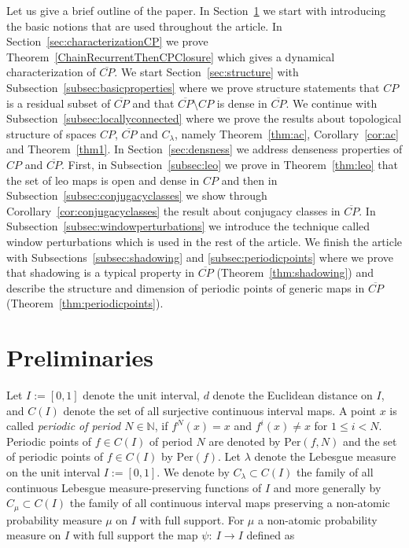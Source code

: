 \documentclass[12pt, a4paper]{amsart}
\def\per{\mathrm{Per}}
\newcommand{\?}{{\bf ???}}
\def\CP{\overline{CP}}
\begin{document}
Let us give a brief outline of the paper. In Section~\ref{subsec:preliminaries} we start with introducing the basic notions that are used throughout the article.
In Section~\ref{sec:characterizationCP} we prove Theorem~\ref{ChainRecurrentThenCPClosure} which gives a dynamical characterization of $\CP$.
We start Section~\ref{sec:structure} with Subsection~\ref{subsec:basicproperties} where we prove structure statements that $CP$ is a residual  subset of $\CP$ and that $\CP\setminus CP$ is dense in $\CP$. We continue with Subsection~\ref{subsec:locallyconnected} where we prove the results about topological structure of spaces $CP$, $\CP$ and $C_{\lambda}$, namely Theorem~\ref{thm:ac}, Corollary~\ref{cor:ac} and Theorem~\ref{thm1}. In Section~\ref{sec:densness} we address denseness properties of $CP$ and $\CP$. First, in Subsection~\ref{subsec:leo} we prove in Theorem~\ref{thm:leo} that the set of leo maps is open and dense in $CP$ and then in Subsection~\ref{subsec:conjugacyclasses} we show through Corollary~\ref{cor:conjugacyclasses} the result about conjugacy classes in $\CP$. In Subsection~\ref{subsec:windowperturbations} we introduce the technique called window perturbations which is used in the rest of the article. We finish the article with Subsections~\ref{subsec:shadowing} and \ref{subsec:periodicpoints} where we prove that shadowing is a typical property in $\CP$ (Theorem~\ref{thm:shadowing}) and describe the structure and dimension of periodic points of generic maps in $\CP$ (Theorem~\ref{thm:periodicpoints}).

\section{Preliminaries}\label{subsec:preliminaries}

Let $I := [0,1]$ denote the unit interval, $d$ denote the 
Euclidean distance on $I$, and  $C(I)$ denote the set of all surjective continuous interval maps.  A point $x$ is called \emph{periodic of period $N\in \mathbb{N}$}, if $f^N(x)=x$ and $f^i(x)\neq x$ for $1\leq i< N$. Periodic points of $f\in C(I)$ of period $N$ are denoted by $\per(f,N)$ and the set of periodic points of $f\in C(I)$ by $\per(f)$. Let $\lambda$ denote the Lebesgue measure on the unit interval $I:=[0,1]$. We denote by $C_{\lambda}\subset C(I)$ the family of all continuous Lebesgue measure-preserving functions of $I$  and more generally by $C_{\mu}\subset C(I)$ the family of all continuous interval maps preserving a non-atomic probability measure $\mu$ on $I$ with full support. For $\mu$ a non-atomic probability measure on $I$ with full support the map $\psi\colon~I\to I$ defined as 
\end{document}
